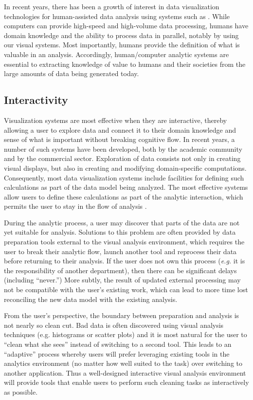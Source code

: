 In recent years, there has been a growth of interest in data visualization technologies for human-assisted data analysis using systems such as \cite{Polaris,Qlik,Spotfire}. While computers can provide high-speed and high-volume data processing, humans have domain knowledge and the ability to process data in parallel, notably by using our visual systems. Most importantly, humans provide the definition of what is valuable in an analysis. Accordingly, human/computer analytic systems are essential to extracting knowledge of value to humans and their societies from the large amounts of data being generated today.

\subsection{Interactivity}
Visualization systems are most effective when they are interactive, thereby allowing a user to explore data and connect it to their domain knowledge and sense of what is important without breaking cognitive flow. In recent years, a number of such systems have been developed, both by the academic community and by the commercial sector. Exploration of data consists not only in creating visual displays, but also in creating and modifying domain-specific computations. Consequently, most data visualization systems include facilities for defining such calculations as part of the data model being analyzed. The most effective systems allow users to define these calculations as part of the analytic interaction, which permits the user to stay in the flow of analysis \cite{Morton}.

During the analytic process, a user may discover that parts of the data are not yet suitable for analysis. Solutions to this problem are often provided by data preparation tools external to the visual analysis environment, which requires the user to break their analytic flow, launch another tool and reprocess their data before returning to their analysis. If the user does not own this process (\textit{e.g.} it is the responsibility of another department), then there can be significant delays (including ``never.'') More subtly, the result of updated external processing may not be compatible with the user's existing work, which can lead to more time lost reconciling the new data model with the existing analysis.

From the user's perspective, the boundary between preparation and analysis is not nearly so clean cut. Bad data is often discovered using visual analysis techniques (e.g. histograms or scatter plots) and it is most natural for the user to ``clean what she sees'' instead of switching to a second tool. This leads to an ``adaptive'' process whereby users will prefer leveraging existing tools in the analytics environment (no matter how well suited to the task) over switching to another application. Thus a well-designed interactive visual analysis environment will provide tools that enable users to perform such cleaning tasks as interactively as possible.

